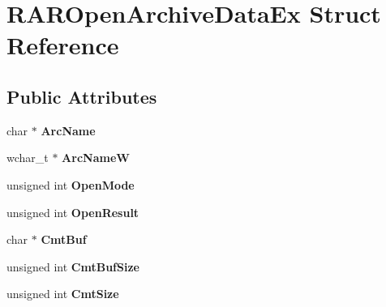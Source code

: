 \hypertarget{struct_r_a_r_open_archive_data_ex}{\section{R\-A\-R\-Open\-Archive\-Data\-Ex Struct Reference}
\label{struct_r_a_r_open_archive_data_ex}
}
\subsection*{Public Attributes}
\begin{DoxyCompactItemize}
\item 
\hypertarget{struct_r_a_r_open_archive_data_ex_ab4a008d96f89226b8316f498b1aecffe}{char $\ast$ {\bfseries Arc\-Name}}\label{struct_r_a_r_open_archive_data_ex_ab4a008d96f89226b8316f498b1aecffe}

\item 
\hypertarget{struct_r_a_r_open_archive_data_ex_ab0462762fbdfee3cb1842b3f909bcd5a}{wchar\-\_\-t $\ast$ {\bfseries Arc\-Name\-W}}\label{struct_r_a_r_open_archive_data_ex_ab0462762fbdfee3cb1842b3f909bcd5a}

\item 
\hypertarget{struct_r_a_r_open_archive_data_ex_aa4919041d923b9b702ede9c6529d664f}{unsigned int {\bfseries Open\-Mode}}\label{struct_r_a_r_open_archive_data_ex_aa4919041d923b9b702ede9c6529d664f}

\item 
\hypertarget{struct_r_a_r_open_archive_data_ex_a89ab93239d6df540aab80a866c306086}{unsigned int {\bfseries Open\-Result}}\label{struct_r_a_r_open_archive_data_ex_a89ab93239d6df540aab80a866c306086}

\item 
\hypertarget{struct_r_a_r_open_archive_data_ex_abba903bef11e2ea0063fca3808685b2e}{char $\ast$ {\bfseries Cmt\-Buf}}\label{struct_r_a_r_open_archive_data_ex_abba903bef11e2ea0063fca3808685b2e}

\item 
\hypertarget{struct_r_a_r_open_archive_data_ex_a463c1a43fcf29d33dfc96cc65fbe7f47}{unsigned int {\bfseries Cmt\-Buf\-Size}}\label{struct_r_a_r_open_archive_data_ex_a463c1a43fcf29d33dfc96cc65fbe7f47}

\item 
\hypertarget{struct_r_a_r_open_archive_data_ex_a088e63ebf2beb25c95de73b941faacd9}{unsigned int {\bfseries Cmt\-Size}}\label{struct_r_a_r_open_archive_data_ex_a088e63ebf2beb25c95de73b941faacd9}


\end{DoxyCompactItemize}
